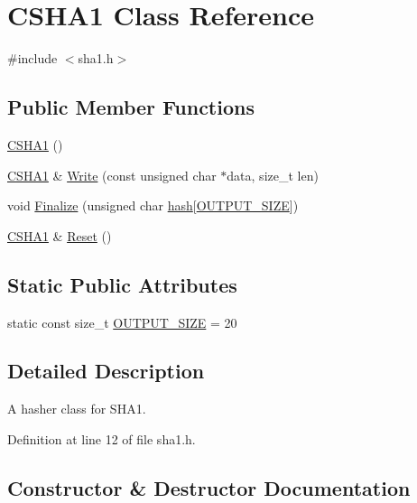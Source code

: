 \hypertarget{class_c_s_h_a1}{}\section{C\+S\+H\+A1 Class Reference}
\label{class_c_s_h_a1}


{\ttfamily \#include $<$sha1.\+h$>$}

\subsection*{Public Member Functions}
\begin{DoxyCompactItemize}
\item 
\hyperlink{class_c_s_h_a1_abf4b9e3a6ea653ca7aabbb076a7f3645}{C\+S\+H\+A1} ()
\item 
\hyperlink{class_c_s_h_a1}{C\+S\+H\+A1} \& \hyperlink{class_c_s_h_a1_a4322be694ccb2d9864e0cd0c30496a8a}{Write} (const unsigned char $\ast$data, size\+\_\+t len)
\item 
void \hyperlink{class_c_s_h_a1_a9a4f829cbe511ca899d27dcab1d0d9e6}{Finalize} (unsigned char \hyperlink{cache_8cc_a11ecb029164e055f28f4123ce3748862}{hash}\mbox{[}\hyperlink{class_c_s_h_a1_a4dc144e60b3e32e7b2908096ecb413ef}{O\+U\+T\+P\+U\+T\+\_\+\+S\+I\+Z\+E}\mbox{]})
\item 
\hyperlink{class_c_s_h_a1}{C\+S\+H\+A1} \& \hyperlink{class_c_s_h_a1_ab7f3006a33ddccdc1f2b2f5da9cb90af}{Reset} ()
\end{DoxyCompactItemize}
\subsection*{Static Public Attributes}
\begin{DoxyCompactItemize}
\item 
static const size\+\_\+t \hyperlink{class_c_s_h_a1_a4dc144e60b3e32e7b2908096ecb413ef}{O\+U\+T\+P\+U\+T\+\_\+\+S\+I\+Z\+E} = 20
\end{DoxyCompactItemize}


\subsection{Detailed Description}
A hasher class for S\+H\+A1. 

Definition at line 12 of file sha1.\+h.



\subsection{Constructor \& Destructor Documentation}
\hypertarget{class_c_s_h_a1_abf4b9e3a6ea653ca7aabbb076a7f3645}{}
